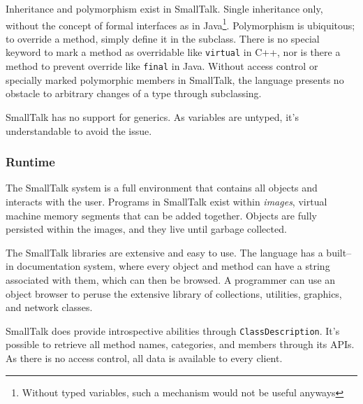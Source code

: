 	Inheritance and polymorphism exist in SmallTalk.  Single inheritance only\cite{802792}, without the concept of formal interfaces as in Java\footnote{Without typed variables, such a mechanism would not be useful anyways}.  Polymorphism is ubiquitous; to override a method, simply define it in the subclass.  There is no special keyword to mark a method as overridable like \texttt{virtual} in C++, nor is there a method to prevent override like \texttt{final} in Java.  Without access control or specially marked polymorphic members in SmallTalk, the language presents no obstacle to arbitrary changes of a type through subclassing.

	

	SmallTalk has no support for generics.  As variables are untyped, it's understandable to avoid the issue.
	
	

\subsubsection{Runtime}

	The SmallTalk system is a full environment that contains all objects and interacts with the user.  Programs in SmallTalk exist within \emph{images}, virtual machine memory segments that can be added together.  Objects are fully persisted within the images, and they live until garbage collected.

	The SmallTalk libraries are extensive and easy to use.  The language has a built--in documentation system, where every object and method can have a string associated with them, which can then be browsed.  A programmer can use an object browser to peruse the extensive library of collections, utilities, graphics, and network classes.

	SmallTalk does provide introspective abilities through \texttt{ClassDescription}.  It's possible to retrieve all method names, categories, and members through its APIs.  As there is no access control, all data is available to every client.

